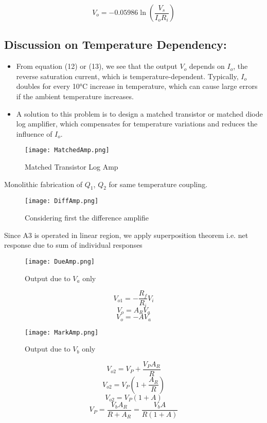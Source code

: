 \documentclass[a4paper,9pt,twoside,openany,twocolumn]{memoir}
\begin{document}
\[
V_o = -0.05986 \ln \left( \frac{V_s}{I_o R_i} \right) \tag{13}
\]

\subsection*{Discussion on Temperature Dependency:}

\begin{itemize}
    \item From equation (12) or (13), we see that the output \( V_o \) depends on \( I_o \), the reverse saturation current, which is temperature-dependent. Typically, \( I_o \) doubles for every 10°C increase in temperature, which can cause large errors if the ambient temperature increases.
    \item A solution to this problem is to design a matched transistor or matched diode log amplifier, which compensates for temperature variations and reduces the influence of \( I_o \).
\end{itemize}
\begin{figure}[H]
    \centering
    \texttt{[image: MatchedAmp.png]}
    \caption{Matched Transistor Log Amp}
    \label{fig:question_image}
\end{figure}
Monolithic fabrication of $Q_1$, $Q_2$ for same temperature coupling.
\begin{figure}[H]
    \centering
    \texttt{[image: DiffAmp.png]}
    \caption{Considering first the difference amplifie}
    \label{fig:question_image}
\end{figure}
Since A3 is operated in linear region, we apply superposition theorem i.e. net response due to sum of individual responses
\begin{figure}[H]
    \centering
    \texttt{[image: DueAmp.png]}
    \caption{Output due to $V_a$ only}
    \label{fig:question_image}
\end{figure}


\[
V_{o1} = -\frac{R_f}{R_i} V_i \tag{1}
\]
\[
V_o = A_R V_a \tag{2}
\]
\[
V_o = - A V_a \tag{3}
\]
\begin{figure}[H]
    \centering
    \texttt{[image: MarkAmp.png]}
    \caption{Output due to $V_b$ only}
    \label{fig:question_image}
\end{figure}
\[
V_{o2} = V_P + \frac{V_P A_R}{R} \tag{4}
\]
\[
V_{o2} = V_P \left( 1 + \frac{A_R}{R} \right) \tag{4a}
\]
\[
V_{o2} = V_P \left( 1 + A \right) \tag{5}
\]
\[
V_P = \frac{V_b A_R}{R + A_R} = \frac{V_b A}{R(1 + A)} \tag{6}
\]
\end{document}
